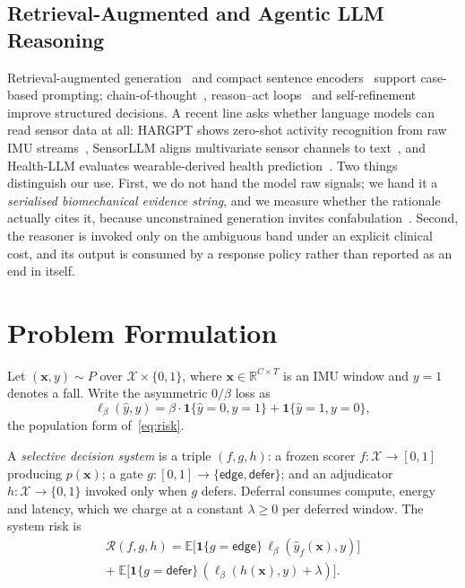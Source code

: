 \documentclass[journal]{IEEEtran}
\begin{document}
\subsection{Retrieval-Augmented and Agentic LLM Reasoning}
Retrieval-augmented generation~\cite{lewis2020rag} and compact sentence encoders~\cite{minilm2020,reimers2019sbert} support case-based prompting; chain-of-thought~\cite{wei2022cot}, reason--act loops~\cite{yao2023react} and self-refinement~\cite{madaan2023selfrefine} improve structured decisions. A recent line asks whether language models can read sensor data at all: HARGPT shows zero-shot activity recognition from raw IMU streams~\cite{ji2024hargpt}, SensorLLM aligns multivariate sensor channels to text~\cite{li2024sensorllm}, and Health-LLM evaluates wearable-derived health prediction~\cite{kim2024healthllm}. Two things distinguish our use. First, we do not hand the model raw signals; we hand it a \emph{serialised biomechanical evidence string}, and we measure whether the rationale actually cites it, because unconstrained generation invites confabulation~\cite{huang2025hallucination,singhal2023medpalm}. Second, the reasoner is invoked only on the ambiguous band under an explicit clinical cost, and its output is consumed by a response policy rather than reported as an end in itself.

\section{Problem Formulation}
\label{sec:problem}

Let $(\mathbf{x},y)\sim P$ over $\mathcal{X}\times\{0,1\}$, where $\mathbf{x}\in\mathbb{R}^{C\times T}$ is an IMU window and $y{=}1$ denotes a fall. Write the asymmetric $0/\beta$ loss as
\begin{equation}
\ell_\beta(\hat{y},y)=\beta\cdot\mathbf{1}\{\hat{y}{=}0,y{=}1\}+\mathbf{1}\{\hat{y}{=}1,y{=}0\},
\label{eq:loss}
\end{equation}
the population form of~\eqref{eq:risk}.

A \emph{selective decision system} is a triple $(f,g,h)$: a frozen scorer $f:\mathcal{X}\to[0,1]$ producing $p(\mathbf{x})$; a gate $g:[0,1]\to\{\textsf{edge},\textsf{defer}\}$; and an adjudicator $h:\mathcal{X}\to\{0,1\}$ invoked only when $g$ defers. Deferral consumes compute, energy and latency, which we charge at a constant $\lambda\ge 0$ per deferred window. The system risk is
\begin{multline}
\mathcal{R}(f,g,h)=\mathbb{E}\big[\mathbf{1}\{g{=}\textsf{edge}\}\,\ell_\beta(\hat{y}_f(\mathbf{x}),y)\big]\\
+\;\mathbb{E}\big[\mathbf{1}\{g{=}\textsf{defer}\}\,(\ell_\beta(h(\mathbf{x}),y)+\lambda)\big].
\label{eq:selrisk}
\end{multline}
\end{document}
